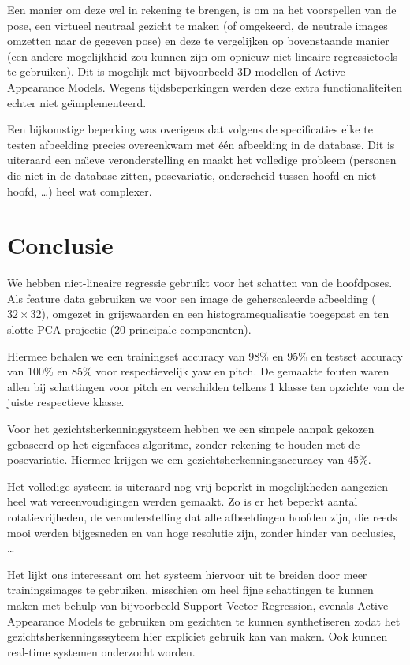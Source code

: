 \documentclass[a4paper,dutch,11pt,]{scrartcl}
\begin{document}
Een manier om deze wel in rekening te brengen, is om na het voorspellen van de pose, een virtueel neutraal gezicht te maken (of omgekeerd, de neutrale images omzetten naar de gegeven pose) en deze te vergelijken op bovenstaande manier (een andere mogelijkheid zou kunnen zijn om opnieuw niet-lineaire regressietools te gebruiken). Dit is mogelijk met bijvoorbeeld 3D modellen of Active Appearance Models. Wegens tijdsbeperkingen werden deze extra functionaliteiten echter niet ge\"{\i}mplementeerd. 

Een bijkomstige beperking was overigens dat volgens de specificaties elke te testen afbeelding precies overeenkwam met \'e\'en afbeelding in de database. Dit is uiteraard een na\"{\i}eve veronderstelling en maakt het volledige probleem (personen die niet in de database zitten, posevariatie, onderscheid tussen hoofd en niet hoofd, \ldots{}) heel wat complexer.


\section{Conclusie}
We hebben niet-lineaire regressie gebruikt voor het schatten van de hoofdposes. Als feature data gebruiken we voor een image de geherscaleerde afbeelding ($32 \times 32$), omgezet in grijswaarden en een histogramequalisatie toegepast en ten slotte PCA projectie (20 principale componenten). 

Hiermee behalen we een trainingset accuracy van 98\% en 95\% en testset accuracy van 100\% en 85\% voor respectievelijk yaw en pitch.
De gemaakte fouten waren allen bij schattingen voor pitch en verschilden telkens 1 klasse ten opzichte van de juiste respectieve klasse.

Voor het gezichtsherkenningsysteem hebben we een simpele aanpak gekozen gebaseerd op het eigenfaces algoritme, zonder rekening te houden met de posevariatie. Hiermee krijgen we een gezichtsherkenningsaccuracy van 45\%.

Het volledige systeem is uiteraard nog vrij beperkt in mogelijkheden aangezien heel wat vereenvoudigingen werden gemaakt. Zo is er het beperkt aantal rotatievrijheden, de veronderstelling dat alle afbeeldingen hoofden zijn, die reeds mooi werden bijgesneden en van hoge resolutie zijn, zonder hinder van occlusies, \ldots{}

Het lijkt ons interessant om het systeem hiervoor uit te breiden door meer trainingsimages te gebruiken, misschien om heel fijne schattingen te kunnen maken met behulp van bijvoorbeeld Support Vector Regression, evenals Active Appearance Models te gebruiken om gezichten te kunnen synthetiseren zodat het gezichtsherkenningsssyteem hier expliciet gebruik kan van maken. Ook kunnen real-time systemen onderzocht worden. 
\end{document}
